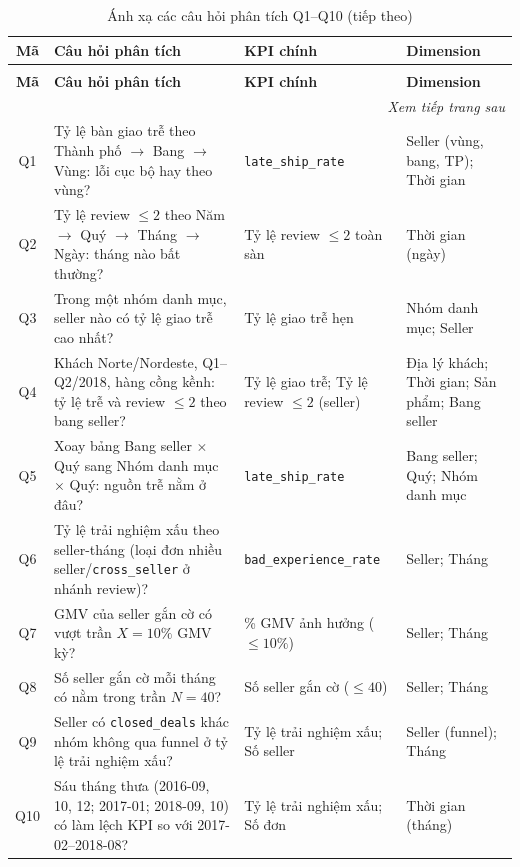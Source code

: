 \documentclass[a4paper]{article}
\begin{document}
\begin{longtable}{@{}c>{\raggedright\arraybackslash}p{}>{\raggedright\arraybackslash}p{}>{\raggedright\arraybackslash}p{}@{}}
\caption{Ánh xạ các câu hỏi phân tích Q1--Q10 với KPI và dimension}\label{tab:analytical_questions}\\
\toprule
\textbf{Mã} & \textbf{Câu hỏi phân tích} & \textbf{KPI chính} & \textbf{Dimension} \\
\midrule
\endfirsthead
\caption[]{Ánh xạ các câu hỏi phân tích Q1--Q10 (tiếp theo)}\\
\toprule
\textbf{Mã} & \textbf{Câu hỏi phân tích} & \textbf{KPI chính} & \textbf{Dimension} \\
\midrule
\endhead
\midrule
\multicolumn{4}{r}{\textit{Xem tiếp trang sau}} \\
\endfoot
\bottomrule
\endlastfoot
Q1 & Tỷ lệ bàn giao trễ theo Thành phố $\to$ Bang $\to$ Vùng: lỗi cục bộ hay theo vùng? & \texttt{late\_ship\_rate} & Seller (vùng, bang, TP); Thời gian \\
Q2 & Tỷ lệ review $\le 2$ theo Năm $\to$ Quý $\to$ Tháng $\to$ Ngày: tháng nào bất thường? & Tỷ lệ review $\le 2$ toàn sàn & Thời gian (ngày) \\
Q3 & Trong một nhóm danh mục, seller nào có tỷ lệ giao trễ cao nhất? & Tỷ lệ giao trễ hẹn & Nhóm danh mục; Seller \\
Q4 & Khách Norte/Nordeste, Q1--Q2/2018, hàng cồng kềnh: tỷ lệ trễ và review $\le 2$ theo bang seller? & Tỷ lệ giao trễ; Tỷ lệ review $\le 2$ (seller) & Địa lý khách; Thời gian; Sản phẩm; Bang seller \\
Q5 & Xoay bảng Bang seller $\times$ Quý sang Nhóm danh mục $\times$ Quý: nguồn trễ nằm ở đâu? & \texttt{late\_ship\_rate} & Bang seller; Quý; Nhóm danh mục \\
Q6 & Tỷ lệ trải nghiệm xấu theo seller-tháng (loại đơn nhiều seller/\texttt{cross\_seller} ở nhánh review)? & \texttt{bad\_experience\_rate} & Seller; Tháng \\
Q7 & GMV của seller gắn cờ có vượt trần $X = 10\%$ GMV kỳ? & \% GMV ảnh hưởng ($\le 10\%$) & Seller; Tháng \\
Q8 & Số seller gắn cờ mỗi tháng có nằm trong trần $N = 40$? & Số seller gắn cờ ($\le 40$) & Seller; Tháng \\
Q9 & Seller có \texttt{closed\_deals} khác nhóm không qua funnel ở tỷ lệ trải nghiệm xấu? & Tỷ lệ trải nghiệm xấu; Số seller & Seller (funnel); Tháng \\
Q10 & Sáu tháng thưa (2016-09, 10, 12; 2017-01; 2018-09, 10) có làm lệch KPI so với 2017-02--2018-08? & Tỷ lệ trải nghiệm xấu; Số đơn & Thời gian (tháng) \\
\end{longtable}
\end{document}
